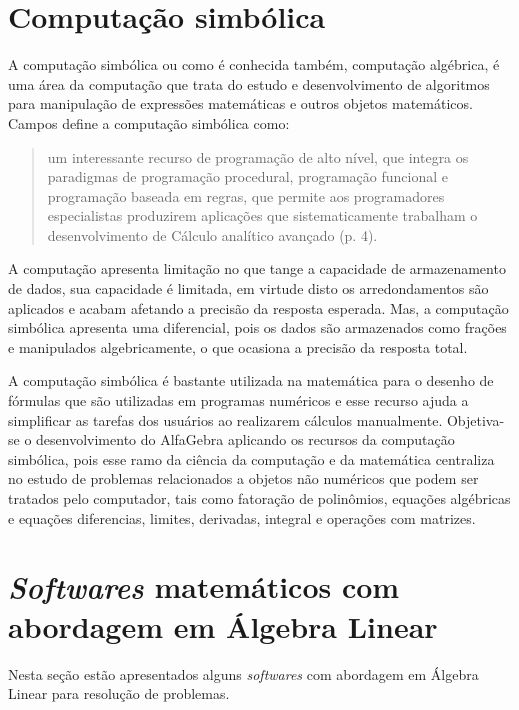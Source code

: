 {{\section{Computação simbólica}
\noindent A computação simbólica ou como é conhecida também, computação algébrica, é uma área da computação que trata do estudo e desenvolvimento de algoritmos para manipulação de expressões matemáticas e outros objetos matemáticos. Campos \cite{2015:Lidio} define a computação simbólica como:
\begin{quote}
    um interessante recurso de programação de alto nível, que integra os paradigmas de programação procedural, programação funcional e programação baseada em regras, que permite aos programadores especialistas produzirem aplicações que sistematicamente trabalham o desenvolvimento de Cálculo analítico avançado (p. 4).  
\end{quote}

A computação apresenta limitação  no que tange a capacidade de armazenamento de dados, sua capacidade é limitada, em virtude disto os arredondamentos são aplicados e acabam afetando a precisão da resposta esperada. Mas, a computação simbólica apresenta uma diferencial, pois os dados são armazenados como frações e manipulados algebricamente, o que ocasiona a precisão da resposta total.

A computação simbólica é bastante utilizada na matemática para o desenho de fórmulas que são utilizadas em programas numéricos e esse recurso ajuda a simplificar as tarefas dos usuários ao realizarem cálculos manualmente. Objetiva-se o desenvolvimento do AlfaGebra aplicando os recursos da computação simbólica, pois esse ramo da ciência da computação e da matemática centraliza no estudo de problemas relacionados a objetos não numéricos que podem ser tratados pelo computador, tais como fatoração de polinômios, equações algébricas e equações diferencias, limites, derivadas, integral e operações com matrizes.

\section{\textit{Softwares} matemáticos com abordagem em Álgebra Linear}
\noindent Nesta seção estão apresentados alguns \textit{softwares} com abordagem em Álgebra Linear para resolução de problemas.

}}
